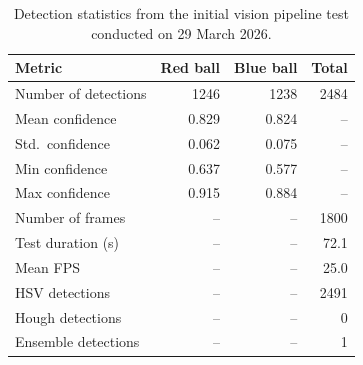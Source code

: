 \begin{table}[H]
    \centering
    \renewcommand{\arraystretch}{1.3}
    \begin{tabular}{|l|r|r|r|}
        \hline
        \textbf{Metric} & \textbf{Red ball} & \textbf{Blue ball} & \textbf{Total} \\
        \hline
        Number of detections    & 1246  & 1238  & 2484 \\
        \hline
        Mean confidence         & 0.829 & 0.824 & --   \\
        \hline
        Std.\ confidence        & 0.062 & 0.075 & --   \\
        \hline
        Min confidence          & 0.637 & 0.577 & --   \\
        \hline
        Max confidence          & 0.915 & 0.884 & --   \\
        \hline
        Number of frames        & --    & --    & 1800 \\
        \hline
        Test duration (s)       & --    & --    & 72.1 \\
        \hline
        Mean FPS                & --    & --    & 25.0 \\
        \hline
        HSV detections          & --    & --    & 2491 \\
        \hline
        Hough detections        & --    & --    & 0    \\
        \hline
        Ensemble detections     & --    & --    & 1    \\
        \hline
    \end{tabular}
    \caption[Detection statistics, 29 March 2026.]{Detection statistics
    from the initial vision pipeline test conducted on 29 March 2026.}
    \label{tab:detection-stats}
\end{table}